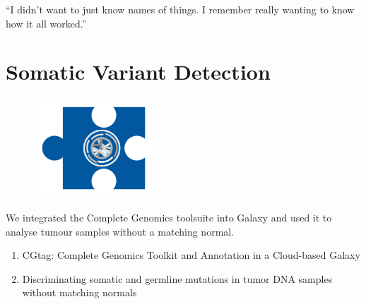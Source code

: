 \begin{savequote}[75mm]
“I didn’t want to just know names of things. I remember really wanting to know how it all worked.”
\end{savequote}

\chapter{Somatic Variant Detection}\label{chapter:virtualnormal}
\setcounter{figure}{-1}
\setcounter{table}{-1}
\setcounter{section}{-1}

\begin{figure}[t!]
\includegraphics[height=10em]{frontmatter/images/chapter-header-variants.png}
\end{figure}
\setcounter{figure}{-1}
\setcounter{table}{-1}
\setcounter{section}{-1}

We integrated the Complete Genomics toolsuite into Galaxy and used it to analyse tumour samples without a matching normal.

\begin{enumerate}
\itemsep-0.5em
\item CGtag: Complete Genomics Toolkit and Annotation in a Cloud-based Galaxy
\item Discriminating somatic and germline mutations in tumor DNA samples without matching normals
\end{enumerate}
